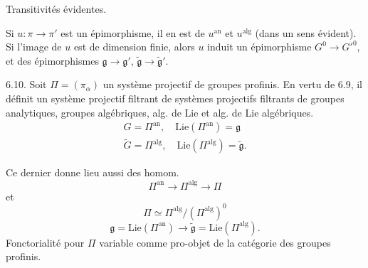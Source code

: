 \documentclass[11pt,a4paper]{article}
\begin{document}


Transitivités évidentes.

Si $u : \pi \to \pi'$ est un épimorphisme, il en est  
de $u^{\mathrm{an}}$ et $u^{\mathrm{alg}}$ (dans un sens évident).
Si l'image de $u$ est de dimension finie, alors
$u$ induit un épimorphisme $G^{0} \to G'^{0}$, et  des
épimorphismes $\mathfrak{g} \to \mathfrak{g}'$, $\widetilde{\mathfrak{g}} \to \widetilde{\mathfrak{g}}'$.

6.10. Soit $\Pi = (\pi_\alpha)$ un système projectif  de groupes
profinis. En vertu de 6.9, il définit un système projectif filtrant de
systèmes projectifs filtrants de groupes analytiques, groupes algébriques,
alg. de Lie et alg. de Lie algébriques.
\begin{gather*}
  G = \Pi^{\mathrm{an}}, \quad \mathrm{Lie}(\Pi^{\mathrm{an}}) = \mathfrak{g} \\
  \widetilde{G} = \Pi^{\mathrm{alg}}, \quad \mathrm{Lie}(\Pi^{\mathrm{alg}}) = \widetilde{\mathfrak{g}} .
  \end{gather*}

Ce dernier donne lieu aussi  des homom.
\[
  \Pi^{\mathrm{an}} \longrightarrow \Pi^{\mathrm{alg}} \longrightarrow \Pi
\]
et
\[
  \Pi \simeq \Pi^{\mathrm{alg}}/(\Pi^{\mathrm{alg}})^{0}
\]
\[
  \mathfrak{g} = \mathrm{Lie}(\Pi^{\mathrm{an}}) \longrightarrow \widetilde{\mathfrak{g}} = \mathrm{Lie}(\Pi^{\mathrm{alg}}) .
\]
Fonctorialité pour $\Pi$ variable comme pro-objet de la catégorie des groupes
profinis.
\end{document}
